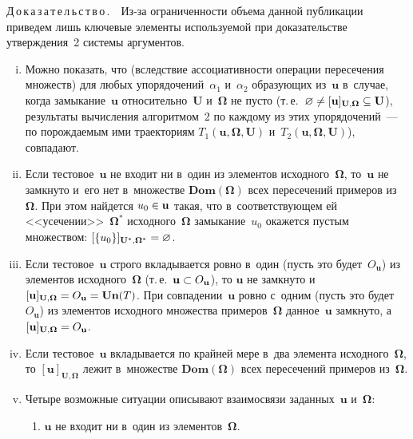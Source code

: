 \begin{multicols}{2}
\noindent
Д\,о\,к\,а\,з\,а\,т\,е\,л\,ь\,с\,т\,в\,о\,.\ \ Из-за ограниченности объема данной 
публикации приведем лишь ключевые элементы используемой при 
доказательстве утверж\-де\-ния~2 системы аргументов.
\begin{enumerate}[(i)]
\item Можно показать, что (вследствие ассоциативности операции 
пересечения множеств) для любых упорядочений~$\alpha_1$ и~$\alpha_2$ 
образу\-ющих из~$\mathbf{u}$ в~случае, когда 
замыкание~$\mathbf{u}$
относительно~$\mathbf{U}$ и~${\boldsymbol{\Omega}}$ не пусто 
(т.\,е.\ $\varnothing\not= 
[\mathbf{u}]_{\mathbf{U},{\boldsymbol{\Omega}}} 
\hm\subseteq \mathbf{U}$), результаты 
вычисления алгоритмом~2 по каждому из этих упорядочений~--- по 
порождаемым ими траекториям $T_1(\mathbf{u}, 
{\boldsymbol{\Omega}}, \mathbf{U})$ 
и~$T_2(\mathbf{u}, {\boldsymbol{\Omega}}, 
\mathbf{U})$), совпадают.
\item Если тестовое~$\mathbf{u}$ не входит ни в~один из элементов 
исходного~${\boldsymbol{\Omega}}$, то~$\mathbf{u}$ не замкнуто и~его нет 
в~множестве $\mathbf{Dom}({\boldsymbol{\Omega}})$ всех пересечений примеров 
из~${\boldsymbol{\Omega}}$. При этом найдется $u_0\hm\in \mathbf{u}$ такая, что 
в~соответствующем ей <<усечении>>~${\boldsymbol{\Omega}}^*$ исходного~${\boldsymbol{\Omega}}$ 
замыкание~$u_0$ окажется пустым множеством: 
$[\{u_0\}]_{\mathbf{U}^*, {\boldsymbol{\Omega}}^*}\hm=\varnothing$.
\item Если тестовое~$\mathbf{u}$ строго вкладывается ровно в~один 
(пусть это будет~$O_{\mathbf{u}}$) из элементов исходного~${\boldsymbol{\Omega}}$ (т.\,е.\ 
$\mathbf{u}\hm\subset O_{\mathbf{u}}$), то $\mathbf{u}$ не замкнуто 
и~$[\mathbf{u}]_{\mathbf{U},{\boldsymbol{\Omega}}} \hm= O_{\mathbf{u}} \hm= \mathbf{Un}(T)$. При 
совпадении~$\mathbf{u}$ ровно с~одним (пусть это будет~$O_{\mathbf{u}}$) из 
элементов исходного множества примеров~${\boldsymbol{\Omega}}$ 
данное~$\mathbf{u}$ замкнуто, 
а~$[\mathbf{u}]_{\mathbf{U},{\boldsymbol{\Omega}}}\hm 
= O_{\mathbf{u}}$.
\item Если тестовое~$\mathbf{u}$ вкладывается по крайней мере 
в~два элемента исходного~${\boldsymbol{\Omega}}$, то 
$[\mathbf{u}]_{\mathbf{U},{\boldsymbol{\Omega}}}$ лежит в~множестве 
$\mathbf{Dom}({\boldsymbol{\Omega}})$ всех пересечений примеров из~${\boldsymbol{\Omega}}$.
\item Четыре возможные ситуации описывают взаимосвязи 
заданных~$\mathbf{u}$ и~${\boldsymbol{\Omega}}$:
\begin{enumerate}[(1)]
\item $\mathbf{u}$ не входит ни в~один из элементов~${\boldsymbol{\Omega}}$.


\end{enumerate}
\end{enumerate}
\end{multicols}
